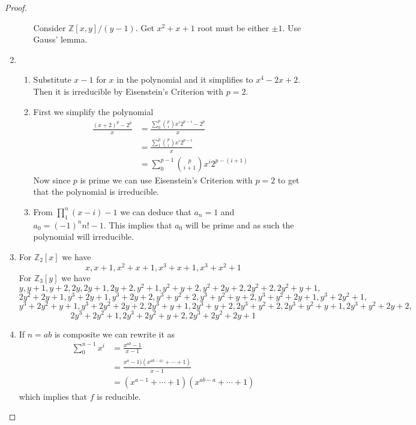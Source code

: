 \documentclass[10pt]{article}
\newcommand{\bb}[1]{\mathbb{#1}}
\theoremstyle{plain}
\theoremstyle{remark}
\begin{document}
\begin{proof}
\begin{enumerate}
\begin{enumerate}
      Consider $\bb{Z}[x,y]/(y-1)$. Get $x^2+x+1$ root must be either $\pm 1$.
      Use Gauss' lemma.
    \end{enumerate}
  \item
    \begin{enumerate}
    \item Substitute $x-1$ for $x$ in the polynomial and it simplifies to
      $x^4-2x+2$. Then it is irreducible by Eisenstein's Criterion with $p=2$.
    \item First we simplify the polynomial
      \begin{align*}
        \frac{(x+2)^p-2^p}{x} &= \frac{\sum_0^p{p\choose i}x^i2^{p-i}-2^p}{x}\\
                            &= \frac{\sum_1^p{p\choose i}x^i2^{p-i}}{x}\\
                            &= \sum_0^{p-1}{p\choose i+1}x^{i}2^{p-(i+1)}
      \end{align*}
      Now since $p$ is prime we can use Eisenstein's Criterion with
      $p=2$ to get that the polynomial is irreducible.
    \item From $\prod_1^n(x-i)-1$ we can deduce that $a_n=1$ and $a_0=(-1)^nn!-1$.
      This implies that $a_0$ will be prime and as such the polynomial will
      irreducible.
    \end{enumerate}
  \item For $\bb{Z}_2[x]$ we have
    \[ x, x + 1, x^{2} + x + 1, x^{3} + x + 1, x^{3} + x^{2} + 1\]
    For $\bb{Z}_3[y]$ we have
    \[y, y + 1, y + 2, 2 y, 2 y + 1, 2 y + 2, y^{2} + 1, y^{2} + y + 2, y^{2} + 2 y + 2, 2 y^{2} + 2, 2 y^{2} + y + 1,\]
    \[ 2 y^{2} + 2 y + 1, y^{3} + 2 y + 1, y^{3} + 2 y + 2, y^{3} + y^{2} + 2, y^{3} + y^{2} + y + 2, y^{3} + y^{2} + 2 y + 1, y^{3} + 2 y^{2} + 1,\]
    \[ y^{3} + 2 y^{2} + y + 1, y^{3} + 2 y^{2} + 2 y + 2, 2 y^{3} + y + 1, 2 y^{3} + y + 2, 2 y^{3} + y^{2} + 2, 2 y^{3} + y^{2} + y + 1, 2 y^{3} + y^{2} + 2 y + 2,\]
    \[ 2 y^{3} + 2 y^{2} + 1, 2 y^{3} + 2 y^{2} + y + 2, 2 y^{3} + 2 y^{2} + 2 y + 1 \]
  \item If $n=ab$ is composite we can rewrite it as
    \begin{align*}
      \sum_0^{n-1}x^i&= \frac{x^{ab}-1}{x-1}\\
                 &= \frac{x^a-1)(x^{ab-a)}+\cdots+1)}{x-1}\\
                 &= (x^{a-1}+\cdots+1)(x^{ab-a}+\cdots+1)
    \end{align*}
    which implies that $f$ is reducible.
  \end{enumerate}
  \end{proof}
\end{document}
